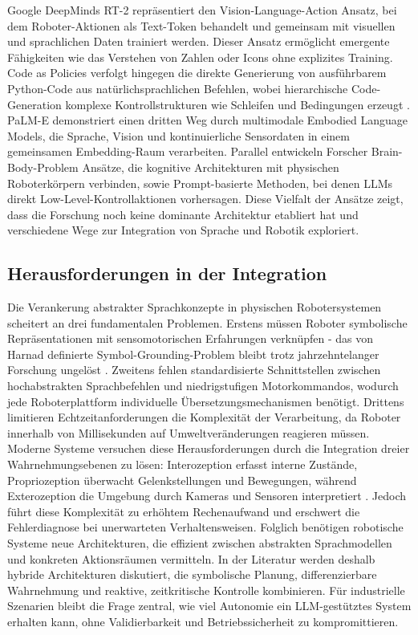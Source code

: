 Google DeepMinds RT-2 repräsentiert den Vision-Language-Action Ansatz, bei dem
Roboter-Aktionen als Text-Token behandelt und gemeinsam mit visuellen und
sprachlichen Daten trainiert werden. Dieser Ansatz ermöglicht emergente
Fähigkeiten wie das Verstehen von Zahlen oder Icons ohne explizites
Training. Code as Policies verfolgt hingegen die
direkte Generierung von ausführbarem Python-Code aus natürlichsprachlichen
Befehlen, wobei hierarchische Code-Generation komplexe Kontrollstrukturen wie
Schleifen und Bedingungen erzeugt . PaLM-E
demonstriert einen dritten Weg durch multimodale Embodied Language Models, die
Sprache, Vision und kontinuierliche Sensordaten in einem gemeinsamen
Embedding-Raum verarbeiten. Parallel entwickeln
Forscher Brain-Body-Problem Ansätze, die kognitive Architekturen mit physischen
Roboterkörpern verbinden, sowie Prompt-basierte Methoden, bei denen LLMs direkt
Low-Level-Kontrollaktionen vorhersagen. Diese Vielfalt der Ansätze zeigt, dass die Forschung noch
keine dominante Architektur etabliert hat und
verschiedene Wege zur Integration von Sprache und Robotik exploriert.

\subsection{Herausforderungen in der Integration}

Die Verankerung abstrakter Sprachkonzepte in physischen Robotersystemen
scheitert an drei fundamentalen Problemen. Erstens müssen Roboter symbolische
Repräsentationen mit sensomotorischen Erfahrungen verknüpfen - das von Harnad
definierte Symbol-Grounding-Problem bleibt trotz jahrzehntelanger Forschung
ungelöst . Zweitens fehlen standardisierte
Schnittstellen zwischen hochabstrakten Sprachbefehlen und niedrigstufigen
Motorkommandos, wodurch jede Roboterplattform individuelle
Übersetzungsmechanismen benötigt. Drittens limitieren Echtzeitanforderungen die
Komplexität der Verarbeitung, da Roboter innerhalb von Millisekunden auf
Umweltveränderungen reagieren müssen. Moderne Systeme versuchen diese
Herausforderungen durch die Integration dreier Wahrnehmungsebenen zu lösen:
Interozeption erfasst interne Zustände, Propriozeption überwacht
Gelenkstellungen und Bewegungen, während Exterozeption die Umgebung durch
Kameras und Sensoren interpretiert . Jedoch führt
diese Komplexität zu erhöhtem Rechenaufwand und erschwert die Fehlerdiagnose bei
unerwarteten Verhaltensweisen. Folglich benötigen robotische Systeme neue
Architekturen, die effizient zwischen abstrakten Sprachmodellen und konkreten
Aktionsräumen vermitteln. In der Literatur werden deshalb hybride Architekturen
diskutiert, die symbolische Planung, differenzierbare Wahrnehmung und reaktive,
zeitkritische Kontrolle kombinieren. Für industrielle Szenarien bleibt die Frage
zentral, wie viel Autonomie ein LLM-gestütztes System erhalten kann, ohne
Validierbarkeit und Betriebssicherheit zu kompromittieren.

